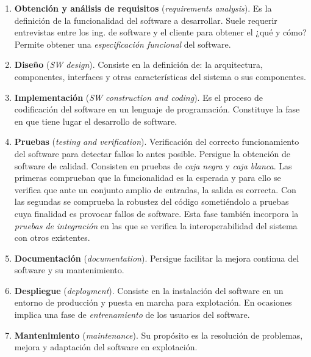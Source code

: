 \begin{enumerate}
\item \textbf{Obtención y análisis de requisitos} 
(\emph{requirements analysis}). Es la definición de la funcionalidad del 
software a desarrollar. Suele requerir entrevistas entre los ing. de software 
y el cliente para obtener el ¿qué y cómo? Permite obtener una 
\emph{especificación funcional} del software.

\item \textbf{Diseño} (\emph{SW design}). Consiste en la 
definición de: la arquitectura, componentes, interfaces y otras 
características del sistema o sus componentes.

\item \textbf{Implementación} (\emph{SW construction and coding}). Es el
  proceso de codificación del software en un lenguaje de programación.
  Constituye la fase en que tiene lugar el desarrollo de software.

\item \textbf{Pruebas} (\emph{testing and verification}). 
Verificación del correcto funcionamiento del software para detectar fallos lo 
antes posible. Persigue la obtención de software de calidad. Consisten en 
pruebas de \emph{caja negra} y \emph{caja blanca}. Las primeras comprueban 
que la funcionalidad es la esperada y para ello se verifica que ante un 
conjunto amplio de entradas, la salida es correcta. Con las segundas se 
comprueba la robustez del código sometiéndolo a pruebas cuya finalidad es 
provocar fallos de software. Esta fase también incorpora la \emph{pruebas de 
integración} en las que se verifica la interoperabilidad del sistema con 
otros existentes.

\item \textbf{Documentación} (\emph{documentation}). Persigue facilitar la mejora continua del software y su mantenimiento.

\item \textbf{Despliegue} (\emph{deployment}). Consiste en 
la instalación del software en un entorno de producción y puesta en marcha 
para explotación. En ocasiones implica una fase de \emph{entrenamiento} de 
los usuarios del software.

\item \textbf{Mantenimiento} (\emph{maintenance}). Su 
propósito es la resolución de problemas, mejora y adaptación del software en 
explotación.
\end{enumerate}




